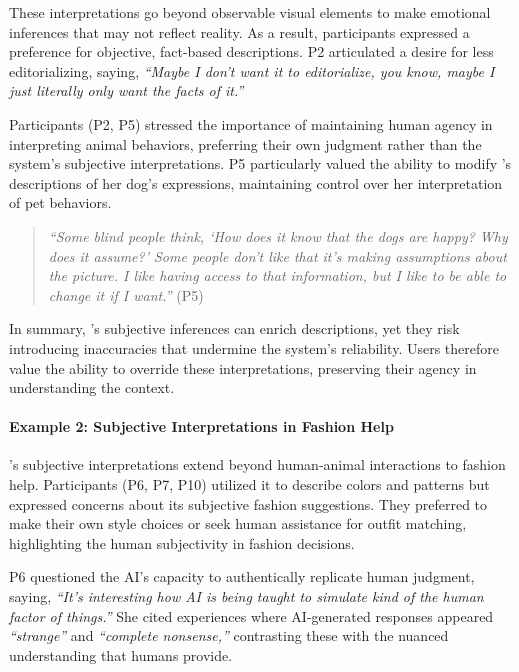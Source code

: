 These interpretations go beyond observable visual elements to make emotional inferences that may not reflect reality. 
% 
As a result, participants expressed a preference for objective, fact-based descriptions. 
P2 articulated a desire for less editorializing, saying, \textit{``Maybe I don't want it to editorialize, you know, maybe I just literally only want the facts of it.''}



Participants (P2, P5) stressed the importance of maintaining human agency in interpreting animal behaviors, preferring their own judgment rather than the system's subjective interpretations. 
P5 particularly valued the ability to modify \sbma's descriptions of her dog's expressions, maintaining control over her interpretation of pet behaviors. 


\begin{quote}
    \textit{``Some blind people think, `How does it know that the dogs are happy? Why does it assume?' Some people don't like that it's making assumptions about the picture. I like having access to that information, but I like to be able to change it if I want.''} (P5)
\end{quote}


In summary, \sbma's subjective inferences can enrich descriptions, yet they risk introducing inaccuracies that undermine the system's reliability. Users therefore value the ability to override these interpretations, preserving their agency in understanding the context. 




\paragraph{Example 2: Subjective Interpretations in Fashion Help}


\sbma's subjective interpretations extend beyond human-animal interactions to fashion help. 
Participants (P6, P7, P10) utilized it to describe colors and patterns but expressed concerns about its subjective fashion suggestions. 
% 
They preferred to make their own style choices or seek human assistance for outfit matching, highlighting the human subjectivity in fashion decisions.



P6 questioned the AI's capacity to authentically replicate human judgment, saying, \textit{``It's interesting how AI is being taught to simulate kind of the human factor of things.''}
% 
She cited experiences where AI-generated responses appeared \textit{``strange''} and \textit{``complete nonsense,''} contrasting these with the nuanced understanding that humans provide.  



